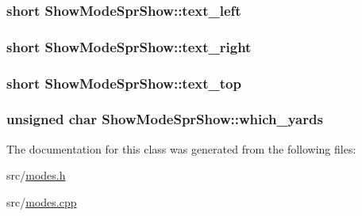 \hypertarget{a00142_ab6c4d816f180a47ef457c343aee27f04}{
\subsubsection[{text\-\_\-left}]{\setlength{\rightskip}{0pt plus 5cm}short Show\-Mode\-Spr\-Show\-::text\-\_\-left\hspace{0.3cm}{\ttfamily [private]}}}\label{a00142_ab6c4d816f180a47ef457c343aee27f04}
\hypertarget{a00142_aad536ebe795a3e73d01f8e722da91957}{
\subsubsection[{text\-\_\-right}]{\setlength{\rightskip}{0pt plus 5cm}short Show\-Mode\-Spr\-Show\-::text\-\_\-right\hspace{0.3cm}{\ttfamily [private]}}}\label{a00142_aad536ebe795a3e73d01f8e722da91957}
\hypertarget{a00142_aef41c2f441e593e56cc86766d02530eb}{
\subsubsection[{text\-\_\-top}]{\setlength{\rightskip}{0pt plus 5cm}short Show\-Mode\-Spr\-Show\-::text\-\_\-top\hspace{0.3cm}{\ttfamily [private]}}}\label{a00142_aef41c2f441e593e56cc86766d02530eb}
\hypertarget{a00142_a2a1927c272421dde7b5b089705c20af2}{
\subsubsection[{which\-\_\-yards}]{\setlength{\rightskip}{0pt plus 5cm}unsigned char Show\-Mode\-Spr\-Show\-::which\-\_\-yards\hspace{0.3cm}{\ttfamily [private]}}}\label{a00142_a2a1927c272421dde7b5b089705c20af2}


The documentation for this class was generated from the following files\-:\begin{DoxyCompactItemize}
\item 
src/\hyperlink{a00236}{modes.\-h}\item 
src/\hyperlink{a00235}{modes.\-cpp}\end{DoxyCompactItemize}
